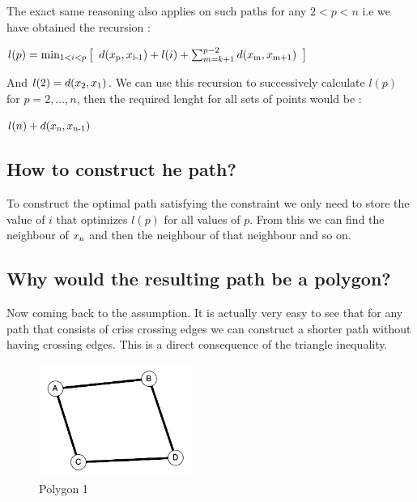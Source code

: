 \documentclass[12pt,letterpaper]{article}
\begin{document}
    The exact same reasoning also applies on such paths for any $2 < p < n$ i.e we have obtained the recursion :

    \begin{center}
        $l(p) = \min_{1<i<p} \big{[}\enspace d(x\textsubscript{p}, x\textsubscript{i-1}) + l(i) + \sum_{m=k+1}^{p-2} d(x\textsubscript{m}, x\textsubscript{m+1})\enspace  \big{]}$
    \end{center}

    And $l(2) = d(x\textsubscript{2}, x\textsubscript{1})$. We can use this recursion to successively calculate $l(p)$ for $p=2,...,n$, then the required lenght for all sets of points would be :

    \begin{center}
        $l(n) + d(x\textsubscript{n}, x\textsubscript{n-1})$
    \end{center}

    \subsection*{How to construct he path?}

        To construct the optimal path satisfying the constraint we only need to store the value of $i$ that optimizes $l(p)$ for all values of $p$. From this we can find the neighbour of $x\textsubscript{n}$ and then the neighbour of that neighbour and so on.

    \subsection*{Why would the resulting path be a polygon?}
        Now coming back to the assumption. It is actually very easy to see that for any path that consists of criss crossing edges we can construct a shorter path without having crossing edges. This is a direct consequence of the triangle inequality.

        \begin{figure}[htp]
            \centering
                \includegraphics[width=5cm]{aPsbRwcprpkjDGQy.png}
                \caption{Polygon 1}
            \label{fig:galaxy}
        \end{figure}
\end{document}
